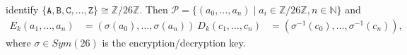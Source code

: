identify $\lbrace \mathtt{A, B, C, …, Z} \rbrace \cong ℤ / 26 ℤ$. Then $\mathcal{P} = \lbrace{(a_0, …,a_n) \mid a_i ∈ ℤ / 26 ℤ, n ∈ ℕ}\rbrace$ and $$\begin{aligned} E_k(a_1, …, a_n) &= (σ(a_0), …, σ(a_n))\ D_k(c_1, …, c_n) &= (σ^{-1}(c_0), …, σ^{-1}(c_n)), \end{aligned}$$ where $σ ∈ Sym(26)$ is the encryption/decryption key.

